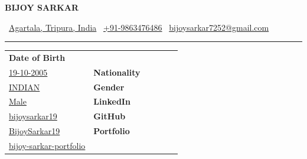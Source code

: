 \documentclass[10pt,a4paper]{article}
\begin{document}

\begin{center}

    {\Huge\bfseries BIJOY SARKAR}

    \vspace{4pt}

    \small
    \faMapMarker\ \href{https://www.google.com/maps/place/Agartala,+Tripura,+India}{Agartala, Tripura, India}
    \hspace{10pt}
    \faPhone\ \href{tel:+919863476486}{+91-9863476486}
    \hspace{10pt}
    \faEnvelope\ 
    \href{https://mail.google.com/mail/?view=cm\&fs=1\&to=bijoysarkar7252@gmail.com\&su=Hello\%20Bijoy\%20-\%20Inquiry\%20from\%20your\%20CV}
    {bijoysarkar7252@gmail.com}


\end{center}

\vspace{-3pt}
\rule{\textwidth}{0.8pt}
\vspace{4pt}


\begin{tabularx}{\textwidth}{@{}X X X X X >{\centering\arraybackslash}p{1.50in}@{}}

\centering
\textbf{Date of Birth}\\
\href{https://calendar.google.com/calendar/u/0/r/day/2005/10/19}{19-10-2005}

&
\centering
\textbf{Nationality}\\
\href{https://www.google.com/maps/place/India}{INDIAN}

&
\centering
\textbf{Gender}\\
\href{https://www.google.com/search?q=Male}{Male}

&
\centering
\textbf{LinkedIn}\\
\href{https://www.linkedin.com/in/bijoysarkar19}
{bijoysarkar19}

&
\centering
\textbf{GitHub}\\
\href{https://github.com/BijoySarkar19}
{BijoySarkar19}

&
\centering
\textbf{Portfolio}\\
\href{https://bijoy-sarkar-portfolio.vercel.app/}
{\mbox{bijoy-sarkar-portfolio}}

\end{tabularx}
\end{document}
